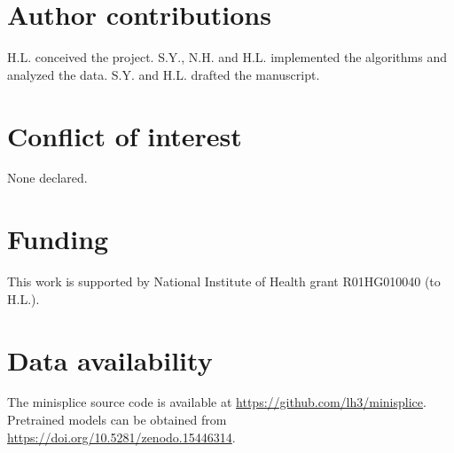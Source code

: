 \documentclass[webpdf,contemporary,large,namedate]{oup-authoring-template}%
\begin{document}
\section*{Author contributions}

H.L. conceived the project.
S.Y., N.H. and H.L. implemented the algorithms and analyzed the data.
S.Y. and H.L. drafted the manuscript.

\section*{Conflict of interest}

None declared.

\section*{Funding}

This work is supported by National Institute of Health grant R01HG010040 (to H.L.).

\section*{Data availability}

The minisplice source code is available at \url{https://github.com/lh3/minisplice}.
Pretrained models can be obtained from \url{https://doi.org/10.5281/zenodo.15446314}.


{\sffamily\small
}
\end{document}
